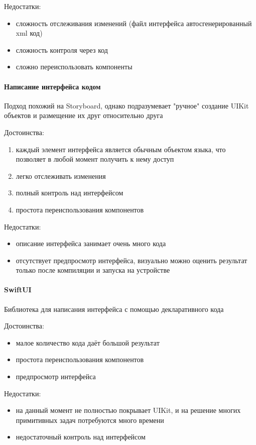       \noindent Недостатки:
      \begin{itemize}
        \item сложность отслеживания изменений (файл интерфейса автосгенерированный xml код)
        \item сложность контроля через код
        \item сложно переиспользовать компоненты
      \end{itemize}



    \paragraph{Написание интерфейса кодом}
      Подход похожий на Storyboard, однако подразумевает "ручное" создание UIKit объектов и размещение их друг относительно друга

      \noindent Достоинства:
      \begin{enumerate}
        \item каждый элемент интерфейса является обычным объектом языка, что позволяет в любой момент получить к нему доступ
        \item легко отслеживать изменения
        \item полный контроль над интерфейсом
        \item простота переиспользования компонентов
      \end{enumerate}

      \noindent Недостатки:
      \begin{itemize}
        \item описание интерфейса занимает очень много кода
        \item отсутствует предпросмотр интерфейса, визуально можно оценить результат только после компиляции и запуска на устройстве
      \end{itemize}


    \paragraph{SwiftUI}
      Библиотека для написания интерфейса с помощью декларативного кода

      \noindent Достоинства:
      \begin{itemize}
        \item малое количество кода даёт большой результат
        \item простота переиспользования компонентов
        \item предпросмотр интерфейса
      \end{itemize}
      \noindent Недостатки:
      \begin{itemize}
        \item на данный момент не полностью покрывает UIKit, и на решение многих примитивных задач потребуются много времени
        \item недостаточный контроль над интерфейсом
      \end{itemize}


